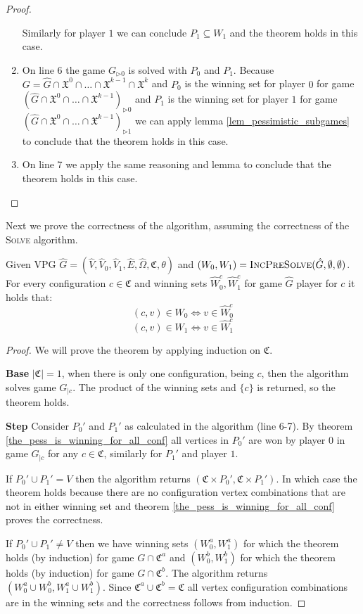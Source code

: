\begin{theorem}
\begin{proof}
\begin{enumerate}
			Similarly for player $1$ we can conclude $P_1 \subseteq W_1$ and the theorem holds in this case.
			\item On line $6$ the game $G_{\triangleright0}$ is solved with $P_0$ and $P_1$. Because $G = \hat{G} \cap \mathfrak{X}^0 \cap \dots \cap \mathfrak{X}^{k-1} \cap \mathfrak{X}^k$ and $P_0$ is the winning set for player $0$ for game $(\hat{G} \cap \mathfrak{X}^0 \cap \dots \cap \mathfrak{X}^{k-1})_{\triangleright0}$ and $P_1$ is the winning set for player $1$ for game $(\hat{G} \cap \mathfrak{X}^0 \cap \dots \cap \mathfrak{X}^{k-1})_{\triangleright1}$ we can apply lemma \ref{lem_pessimistic_subgames} to conclude that the theorem holds in this case.
			\item On line $7$ we apply the same reasoning and lemma to conclude that the theorem holds in this case.
		\end{enumerate}
	\end{proof}
\end{theorem}

Next we prove the correctness of the algorithm, assuming the correctness of the \textsc{Solve} algorithm.
\begin{theorem}
	Given VPG $\hat{G} = (\hat{V},\hat{V}_0,\hat{V}_1,\hat{E},\hat{\Omega},\mathfrak{C},\theta)$ and $(W_0,W_1) = \textsc{IncPreSolve}(\hat{G},\emptyset,\emptyset)$. For every configuration $c \in \mathfrak{C}$ and winning sets $\hat{W}_0^c, \hat{W}_1^c$ for game $\hat{G}$ player for $c$ it holds that:
	\[ (c,v) \in W_0 \iff v \in \hat{W}_0^c \]
	\[ (c,v) \in W_1 \iff v \in \hat{W}_1^c \]
	\begin{proof}
		We will prove the theorem by applying induction on $\mathfrak{C}$.
		
		\textbf{Base} $|\mathfrak{C}| = 1$, when there is only one configuration, being $c$, then the algorithm solves game $G_{|c}$. The product of the winning sets and $\{c\}$ is returned, so the theorem holds.
		
		\textbf{Step} Consider $P_0'$ and $P_1'$ as calculated in the algorithm (line 6-7). By theorem \ref{the_pess_is_winning_for_all_conf} all vertices in $P_0'$ are won by player $0$ in game $G_{|c}$ for any $c \in \mathfrak{C}$, similarly for $P_1'$ and player $1$.
		
		If $P_0' \cup P_1' = V$ then the algorithm returns $(\mathfrak{C} \times P_0',\mathfrak{C} \times P_1')$. In which case the theorem holds because there are no configuration vertex combinations that are not in either winning set and theorem \ref{the_pess_is_winning_for_all_conf} proves the correctness.
		
		If $P_0' \cup P_1' \neq V$ then we have winning sets $(W_0^a, W_1^a)$ for which the theorem holds (by induction) for game $G \cap \mathfrak{C}^a$ and $(W_0^b, W_1^b)$ for which the theorem holds (by induction) for game $G \cap \mathfrak{C}^b$. The algorithm returns $(W_0^a \cup W_0^b, W_1^a \cup W_1^b)$. Since $\mathfrak{C}^a \cup \mathfrak{C}^b = \mathfrak{C}$ all vertex configuration combinations are in the winning sets and the correctness follows from induction.
	\end{proof}
\end{theorem}

